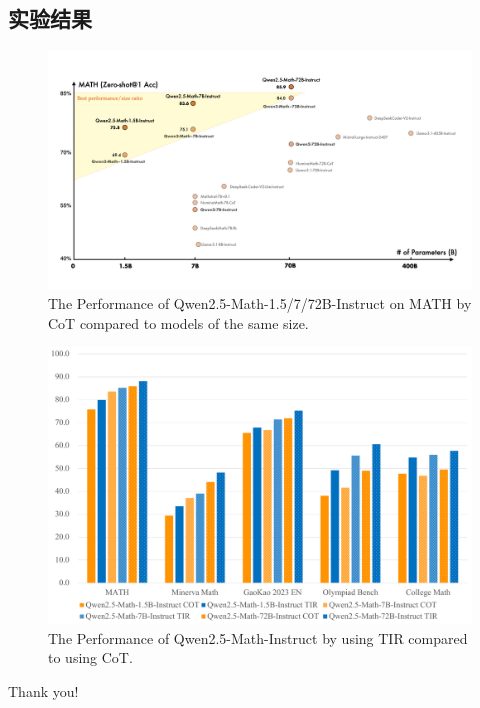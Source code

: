 \documentclass[aspectratio=169]{beamer}
\begin{document}
\subsection{实验结果}
\begin{frame}
    \begin{figure}[htbp]
        \centering
        \includegraphics[width=0.8\columnwidth]{pic/all_size.png}
        \vspace{-1mm}
        \caption{The Performance of Qwen2.5-Math-1.5/7/72B-Instruct on MATH by CoT compared to models of the same size.}
        \label{fig:exp}
    \end{figure}
\end{frame}
    
\begin{frame}
    \begin{figure}[htbp]
        \centering
        \includegraphics[width=0.7\columnwidth]{pic/COT_vs_TIR.pdf}
        \caption{The Performance of Qwen2.5-Math-Instruct by using TIR compared to using CoT.}
        \label{fig:exp_tir}
    \end{figure}
\end{frame}






\begin{frame}
    \begin{center}
        {\Huge Thank you!}
    \end{center}
\end{frame}
\end{document}
